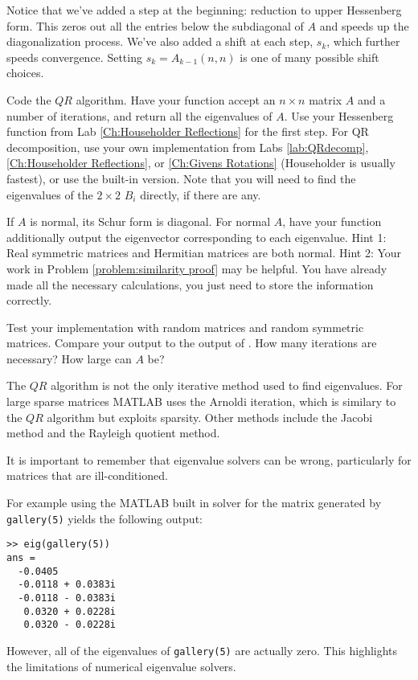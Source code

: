Notice that we've added a step at the beginning: reduction to upper Hessenberg form. This zeros out all the entries below the subdiagonal of $A$ and speeds up the diagonalization process. We've also added a shift at each step, $s_k$, which further speeds convergence. Setting $s_k = A_{k-1}(n,n)$ is one of many possible shift choices.

\begin{problem}
Code the $QR$ algorithm. Have your function accept an $n \times n$ matrix $A$ and a number of iterations, and return all the eigenvalues of $A$. Use your Hessenberg function from Lab \ref{Ch:Householder Reflections} for the first step. For QR decomposition, use your own implementation from Labs \ref{lab:QRdecomp}, \ref{Ch:Householder Reflections}, or \ref{Ch:Givens Rotations} (Householder is usually fastest), or use the built-in version. Note that you will need to find the eigenvalues of the $2 \times 2$ $B_i$ directly, if there are any.
\end{problem}

\begin{problem}
If $A$ is normal, its Schur form is diagonal. For normal $A$, have your function additionally output the eigenvector corresponding to each eigenvalue. Hint 1: Real symmetric matrices and Hermitian matrices are both normal. Hint 2: Your work in Problem \ref{problem:similarity proof} may be helpful. You have already made all the necessary calculations, you just need to store the information correctly.
\end{problem}

\begin{problem}
Test your implementation with random matrices and random symmetric matrices. Compare your output to the output of . How many iterations are necessary? How large can $A$ be?
\end{problem}

The $QR$ algorithm is not the only iterative method used to find eigenvalues. For large sparse matrices MATLAB uses the Arnoldi iteration, which is similary to the $QR$ algorithm but exploits sparsity. Other methods include the Jacobi method and the Rayleigh quotient method.

It is important to remember that eigenvalue solvers can be wrong, particularly for matrices that are ill-conditioned. 
\begin{matlab}
For example using the MATLAB built in solver for the matrix generated by {\tt gallery(5)} yields the following output:
\begin{lstlisting}[style=matlab]
>> eig(gallery(5))
ans =
  -0.0405          
  -0.0118 + 0.0383i
  -0.0118 - 0.0383i
   0.0320 + 0.0228i
   0.0320 - 0.0228i
\end{lstlisting}

However, all of the eigenvalues of {\tt gallery(5)} are actually zero. This highlights the limitations of numerical eigenvalue solvers.
\end{matlab}
